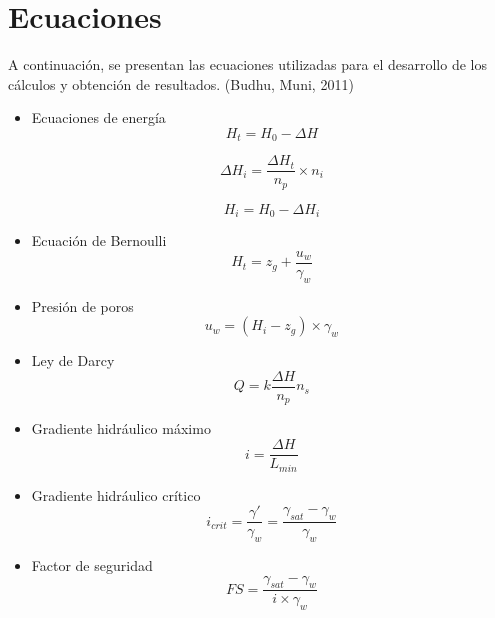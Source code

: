 \documentclass{article} %
\begin{document}
\newpage

\section{Ecuaciones} \label{ecuaciones}

A continuación, se presentan las ecuaciones utilizadas para el desarrollo de los cálculos y obtención de resultados. (Budhu, Muni, 2011)

\begin{itemize}
\item Ecuaciones de energía
\begin{equation}
    H_t = H_0 - \Delta H
\end{equation}

\begin{equation}
    \Delta H_i = \frac{\Delta H_t}{n_p} \times n_i
\end{equation}

\begin{equation}
    H_i = H_0 - \Delta H_i
\end{equation}

\item Ecuación de Bernoulli
\begin{equation}
    H_t = z_g + \frac{u_w}{\gamma_w}
\end{equation}

\item Presión de poros
\begin{equation}
    u_w = (H_i - z_g) \times \gamma_w
\end{equation}

\item Ley de Darcy
\begin{equation}
    Q = k \frac{\Delta H}{n_p} n_s
    \label{eq:ley_darcy}
\end{equation}

\item Gradiente hidráulico máximo
\begin{equation}
    i = \frac{\Delta H}{L_{min}}
    \label{eq:gradiente_hidraulico}
\end{equation}

\item Gradiente hidráulico crítico
\begin{equation}
    i_{crit} = \frac{\gamma'}{\gamma_w} = \frac{\gamma_{sat} - \gamma_w}{\gamma_w}
    \label{eq:gradiente_critico}
\end{equation}

\item Factor de seguridad
\begin{equation}
    FS = \frac{\gamma_{sat} - \gamma_w}{i \times \gamma_w}
    \label{eq:factor_seguridad}
\end{equation}

\end{itemize}
\end{document}
